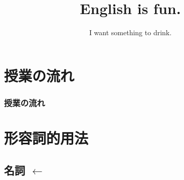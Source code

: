 \documentclass[aspectratio=169,xcolor={dvipsnames,table}]{beamer}
\title{English is fun.}
\subtitle{I want something to drink.}
\author{}
\institute[]{}
\date[]
\begin{document}
\begin{frame}[plain]
  \titlepage
\end{frame}

\section*{授業の流れ}
\begin{frame}[plain]
  \frametitle{授業の流れ}
  \tableofcontents
\end{frame}

\section{形容詞的用法}
\subsection{名詞 $\longleftarrow$ }
\end{document}

